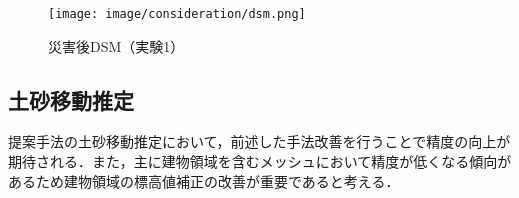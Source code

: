       \begin{figure}[tbp]
        \centering
        \texttt{[image: image/consideration/dsm.png]}
        \caption{災害後DSM（実験1）}
        \label{災害後DSM（実験1）}
      \end{figure}


    \subsection*{土砂移動推定}
      提案手法の土砂移動推定において，前述した手法改善を行うことで精度の向上が期待される．また，主に建物領域を含むメッシュにおいて精度が低くなる傾向があるため建物領域の標高値補正の改善が重要であると考える．
